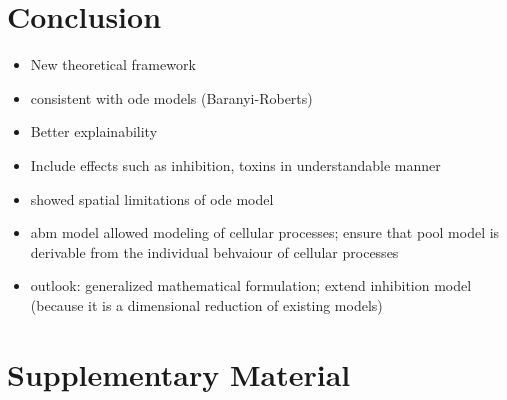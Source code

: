 \documentclass[10pt,A4paper]{article}
\numberwithin{equation}{section}
\newcommand{\beginsupplement}{%
  \renewcommand{\thesection}{}
  \setcounter{subsection}{0}
  \renewcommand{\thesubsection}{S\arabic{subsection}}
  \setcounter{table}{0}
  \renewcommand{\thetable}{S\arabic{table}}%
  \setcounter{figure}{0}
  \renewcommand{\thefigure}{S\arabic{figure}}%
  \setcounter{listing}{0}
  \renewcommand{\thelisting}{S\arabic{listing}}
}
\begin{document}
\section{Conclusion}
\noindent
\begin{itemize}
    \item New theoretical framework
    \item consistent with \ac{ode} models (Baranyi-Roberts)
    \item Better explainability
    \item Include effects such as inhibition, toxins in understandable manner
    \item showed spatial limitations of \ac{ode} model
    \item \ac{abm} model allowed modeling of cellular processes; ensure that pool model is derivable
        from the individual behvaiour of cellular processes
    \item outlook: generalized mathematical formulation; extend inhibition model (because it is a
        dimensional reduction of existing models)
\end{itemize}

\onecolumn

\newpage
\printbibliography

\newpage
\beginsupplement
\section{Supplementary Material}
\end{document}
